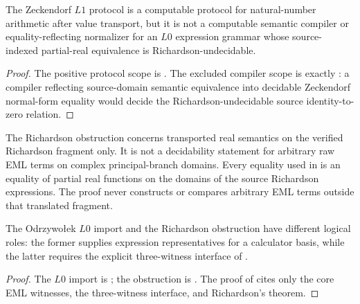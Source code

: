 \begin{corollary}
\label{cor:compile-scope}
The Zeckendorf \(L1\) protocol is a computable protocol for natural-number
arithmetic after value transport, but it is not a computable semantic compiler
or equality-reflecting normalizer for an \(L0\) expression grammar whose
source-indexed partial-real equivalence is Richardson-undecidable.
\end{corollary}

\begin{proof}
The positive protocol scope is .  The excluded
compiler scope is exactly : a compiler reflecting
source-domain semantic equivalence into decidable Zeckendorf normal-form equality
would decide the Richardson-undecidable source identity-to-zero relation.
\end{proof}

\begin{remark}
The Richardson obstruction concerns transported real semantics on the verified
Richardson fragment only.  It is not a decidability statement for arbitrary raw
EML terms on complex principal-branch domains.
Every equality used in  is an equality of
partial real functions on the domains of the source Richardson expressions.
The proof never constructs or compares arbitrary EML terms outside that
translated fragment.
\end{remark}

\begin{proposition}
\label{prop:external-versus-locked-package}
\label{thm:no-hidden-L0-semantic-normalizer}
The Odrzywo{\l}ek \(L0\) import and the Richardson obstruction have different
logical roles: the former supplies expression representatives for a calculator
basis, while the latter requires the explicit three-witness interface of
.
\end{proposition}

\begin{proof}
The \(L0\) import is ; the obstruction is
.  The proof of  cites only the core
EML witnesses, the three-witness interface, and Richardson's theorem.
\end{proof}


